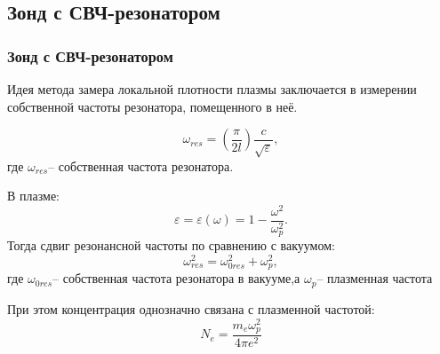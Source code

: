 \documentclass[10pt,pdf,hyperref={unicode}, dvipsnames]{beamer}
\begin{document}
\subsection{Зонд с СВЧ-резонатором} %

\begin{frame}
	\frametitle{Зонд с СВЧ-резонатором}
	Идея метода замера локальной  плотности плазмы заключается в измерении собственной частоты резонатора, помещенного в неё.

	\begin{equation}
		\omega_{res}=\left(\frac\pi{2l}\right)\frac c{\sqrt{\varepsilon}},
	\end{equation}
	где $\omega_{res}$-- собственная частота резонатора.

	В плазме: $$\varepsilon=\varepsilon(\omega)=1-\frac{\omega^2}{\omega_p^2}.$$ 
	Тогда сдвиг резонансной частоты по сравнению с вакуумом:
	$$\omega_{res}^2=\omega_{0res}^2+\omega_p^2,$$ 
	где $\omega_{0res}$-- собственная частота резонатора в вакууме,а $\omega_p$-- плазменная частота

	При этом концентрация однозначно связана с плазменной частотой:
	\begin{equation}
		N_e=\frac{m_e\omega^2_p}{4\pi e^2}
	\end{equation}
\end{frame}
\end{document}
